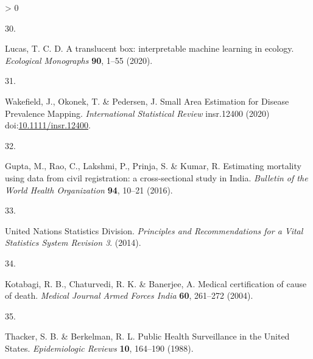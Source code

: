 \documentclass[
]{article}
\newlength{\cslhangindent}
\newlength{\csllabelwidth}
\newenvironment{CSLReferences}[2] %
 {%
  \setlength{\parindent}{0pt}
  \ifodd #1 \everypar{\setlength{\hangindent}{\cslhangindent}}\ignorespaces\fi
  \ifnum #2 > 0
  \setlength{\parskip}{#2\baselineskip}
  \fi
 }%
 {}
\newcommand{\CSLLeftMargin}[1]{\parbox[t]{\csllabelwidth}{#1}}
\newcommand{\CSLRightInline}[1]{\parbox[t]{\linewidth - \csllabelwidth}{#1}\break}
\begin{document}
\begin{CSLReferences}{0}{0}
\leavevmode\hypertarget{ref-Lucas2020a}{}%
\CSLLeftMargin{30. }
\CSLRightInline{Lucas, T. C. D. {A translucent box: interpretable machine learning in ecology}. \emph{Ecological Monographs} \textbf{90}, 1--55 (2020).}

\leavevmode\hypertarget{ref-Wakefield2020}{}%
\CSLLeftMargin{31. }
\CSLRightInline{Wakefield, J., Okonek, T. \& Pedersen, J. {Small Area Estimation for Disease Prevalence Mapping}. \emph{International Statistical Review} insr.12400 (2020) doi:\href{https://doi.org/10.1111/insr.12400}{10.1111/insr.12400}.}

\leavevmode\hypertarget{ref-Gupta2016}{}%
\CSLLeftMargin{32. }
\CSLRightInline{Gupta, M., Rao, C., Lakshmi, P., Prinja, S. \& Kumar, R. {Estimating mortality using data from civil registration: a cross-sectional study in India}. \emph{Bulletin of the World Health Organization} \textbf{94}, 10--21 (2016).}

\leavevmode\hypertarget{ref-UnitedNationsStatisticsDivision2014}{}%
\CSLLeftMargin{33. }
\CSLRightInline{United Nations Statistics Division. \emph{{Principles and Recommendations for a Vital Statistics System Revision 3}}. (2014).}

\leavevmode\hypertarget{ref-Kotabagi2004}{}%
\CSLLeftMargin{34. }
\CSLRightInline{Kotabagi, R. B., Chaturvedi, R. K. \& Banerjee, A. {Medical certification of cause of death}. \emph{Medical Journal Armed Forces India} \textbf{60}, 261--272 (2004).}

\leavevmode\hypertarget{ref-Thacker1988}{}%
\CSLLeftMargin{35. }
\CSLRightInline{Thacker, S. B. \& Berkelman, R. L. {Public Health Surveillance in the United States}. \emph{Epidemiologic Reviews} \textbf{10}, 164--190 (1988).}

\end{CSLReferences}
\end{document}
